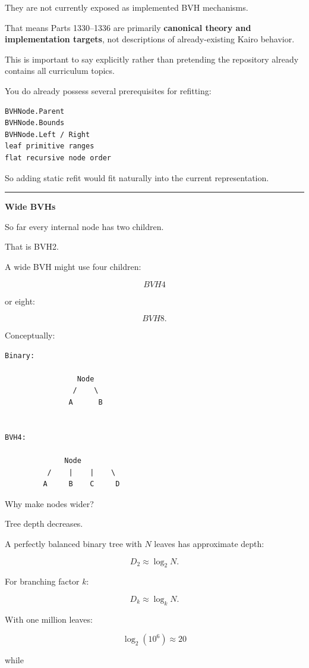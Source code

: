 They are not currently exposed as implemented BVH mechanisms.

That means Parts 1330--1336 are primarily \textbf{canonical theory and implementation targets}, not descriptions of already-existing Kairo behavior.

This is important to say explicitly rather than pretending the repository already contains all curriculum topics.

You do already possess several prerequisites for refitting:

\begin{verbatim}
BVHNode.Parent
BVHNode.Bounds
BVHNode.Left / Right
leaf primitive ranges
flat recursive node order
\end{verbatim}

So adding static refit would fit naturally into the current representation.

\begin{center}\rule{0.5\linewidth}{0.5pt}\end{center}

\textbf{Wide BVHs}

So far every internal node has two children.

That is BVH2.

A wide BVH might use four children:

\[
BVH4
\]

or eight:

\[
BVH8.
\]

Conceptually:

\begin{verbatim}
Binary:

                 Node
                /    \
               A      B


BVH4:

              Node
          /    |    |    \
         A     B    C     D
\end{verbatim}

Why make nodes wider?

Tree depth decreases.

A perfectly balanced binary tree with \(N\) leaves has approximate depth:

\[
D_2\approx\log_2N.
\]

For branching factor \(k\):

\[
D_k\approx\log_kN.
\]

With one million leaves:

\[
\log_2(10^6)\approx20
\]

while

